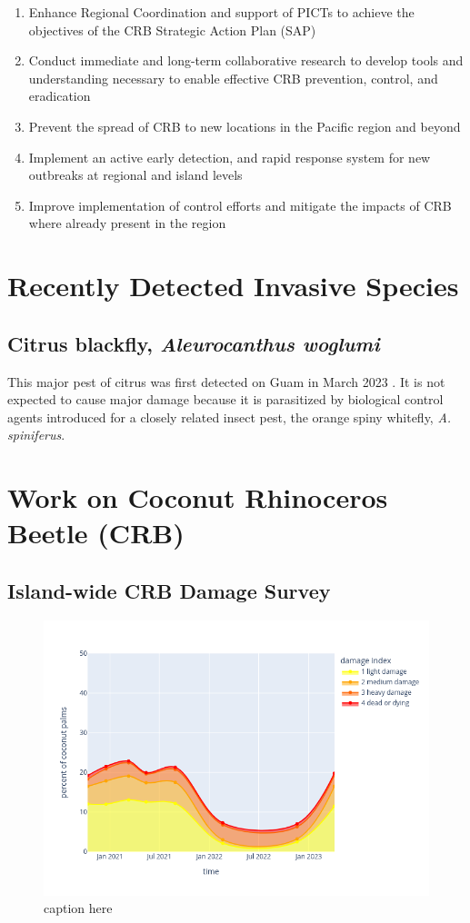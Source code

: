 \documentclass[]{scrartcl}
\begin{document}
\begin{enumerate}
	\item Enhance Regional Coordination and support of PICTs to achieve the
	objectives of the CRB Strategic Action Plan (SAP)
	\item Conduct immediate and long-term collaborative research to develop
	tools and understanding necessary to enable effective CRB prevention, control, and
	eradication
	\item Prevent the spread of CRB to new locations in the Pacific region and
	beyond
	\item Implement an active early detection, and rapid response system for new
	outbreaks at regional and island levels
	\item Improve implementation of control efforts and mitigate the impacts of
	CRB where already present in the region
	
\end{enumerate} 

\section{Recently Detected Invasive Species}

\subsection{Citrus blackfly, \textit{Aleurocanthus woglumi}}

This major pest of citrus was first detected on Guam in March 2023 \cite{moore2023}. It is not expected to cause major damage because it is parasitized by biological control agents introduced for a closely related insect pest, the orange spiny whitefly, \textit{A. spiniferus}.

\section{Work on Coconut Rhinoceros Beetle (CRB)}

\subsection{Island-wide CRB Damage Survey}

\cite{moorePressRelease2023}

\begin{figure}[h]
	\centering
	\includegraphics[width=0.7\linewidth]{images/timeline}
	\caption{caption here}
	\label{fig:timeline}
\end{figure}
\end{document}
